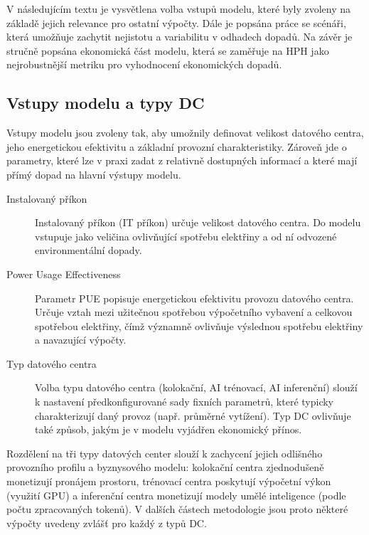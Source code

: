 V následujícím textu je vysvětlena volba vstupů modelu, které byly zvoleny na základě jejich relevance pro ostatní výpočty. Dále je popsána práce se scénáři, která umožňuje zachytit nejistotu a variabilitu v odhadech dopadů. Na závěr je stručně popsána ekonomická část modelu, která se zaměřuje na HPH jako nejrobustnější metriku pro vyhodnocení ekonomických dopadů.

\subsection{Vstupy modelu a typy DC}
\label{subsec:model_vstupy}

Vstupy modelu jsou zvoleny tak, aby umožnily definovat velikost datového centra, jeho energetickou efektivitu a základní provozní charakteristiky. Zároveň jde o parametry, které lze v praxi zadat z relativně dostupných informací a které mají přímý dopad na hlavní výstupy modelu.

\begin{description}

	\item[Instalovaný příkon] Instalovaný příkon (IT příkon) určuje velikost datového centra. Do modelu vstupuje jako veličina ovlivňující spotřebu elektřiny a od ní odvozené environmentální dopady.

	\item[Power Usage Effectiveness] Parametr PUE popisuje energetickou efektivitu provozu datového centra. Určuje vztah mezi užitečnou spotřebou výpočetního vybavení a celkovou spotřebou elektřiny, čímž významně ovlivňuje výslednou spotřebu elektřiny a navazující výpočty.

	\item[Typ datového centra] Volba typu datového centra (kolokační, AI trénovací, AI inferenční) slouží k nastavení předkonfigurované sady fixních parametrů, které typicky charakterizují daný provoz (např. průměrné vytížení). Typ DC ovlivňuje také způsob, jakým je v modelu vyjádřen ekonomický přínos.
	
\end{description}

Rozdělení na tři typy datových center slouží k zachycení jejich odlišného provozního profilu a byznysového modelu: kolokační centra zjednodušeně monetizují pronájem prostoru, trénovací centra poskytují výpočetní výkon (využití GPU) a inferenční centra monetizují modely umělé inteligence (podle počtu zpracovaných tokenů). V dalších částech metodologie jsou proto některé výpočty uvedeny zvlášť pro každý z typů DC.

